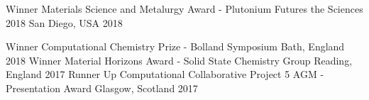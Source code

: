 \begin{cvhonors}
  \cvhonor
    {Winner}
    {Materials Science and Metalurgy Award - Plutonium Futures the Sciences 2018}
    {San Diego, USA}
    {2018}
\end{cvhonors}

\begin{cvhonors}
  \cvhonor
    {Winner}
    {Computational Chemistry Prize - Bolland Symposium}
    {Bath, England}
    {2018}
   \cvhonor
    {Winner}
    {Material Horizons Award - Solid State Chemistry Group}
    {Reading, England}
    {2017}
   \cvhonor
    {Runner Up}
    {Computational Collaborative Project 5 AGM - Presentation Award}
    {Glasgow, Scotland}
    {2017}
\end{cvhonors}